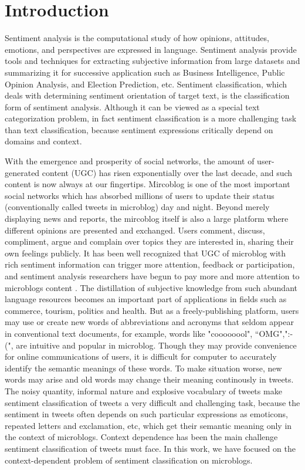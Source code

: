 \documentclass{llncs}
\begin{document}
\section{Introduction}
\label{intro}
Sentiment analysis is the computational study of how opinions, attitudes, emotions, and perspectives are expressed in language. 
Sentiment analysis provide tools and techniques for extracting subjective information from large datasets and summarizing it for successive application such as Business Intelligence, Public Opinion Analysis, and Election Prediction, etc\cite{xsongx:b1}. 
Sentiment classification, which deals with determining sentiment orientation of target text, is the classification form of sentiment analysis\cite{xsongx:b2}. 
Although it can be viewed as a special text categorization problem, in fact sentiment classification is a more challenging task than text classification, because sentiment expressions critically depend on domains and context\cite{xsongx:b6}.

With the emergence and prosperity of social networks, the amount of user-generated content (UGC) has risen exponentially over the last decade, and such content is now always at our fingertips.
Mircoblog is one of the most important social networks which has absorbed millions of users to update their status (conventionally called tweets in microblog) day and night.
Beyond merely displaying news and reports, the mircoblog itself is also a large platform where different opinions are presented and exchanged. 
Users comment, discuss, compliment, argue and complain over topics they are interested in, sharing their own feelings publicly. 
It has been well recognized that UGC of microblog with rich sentiment information can trigger more attention, feedback or participation, and sentiment analysis researchers have begun to pay more and more attention to microblogs content \cite{DBLP:conf/hicss/StieglitzD12}.
The distillation of subjective knowledge from such abundant language resources becomes an important part of applications in fields such as commerce, tourism, politics and health. 
But as a freely-publishing platform, users may use or create new words of abbreviations and acronyms that seldom appear in conventional text documents, for example, words like "coooooool", “OMG",":-(", are intuitive and popular in microblog.
Though they may provide convenience for online communications of users, it is difficult for computer to accurately identify the semantic meanings of these words. 
To make situation worse, new words may arise and old words may change their meaning continously in tweets.
The noisy quantity, informal nature and explosive vocabulary of tweets make sentiment classification of tweets a very difficult and challenging task, because the sentiment in tweets often depends on such particular expressions as emoticons, repeated letters and exclamation, etc, which get their semantic meaning only in the context of microblogs. 
Context dependence has been the main challenge sentiment classification of tweets must face.
In this work, we have focused on the context-dependent problem of sentiment classification on microblogs. 
\end{document}
